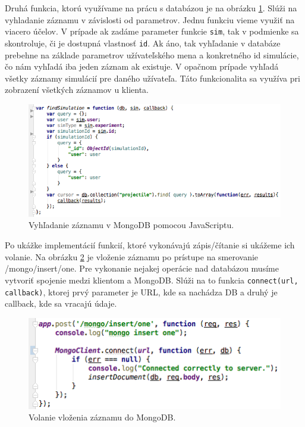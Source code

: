 Druhá funkcia, ktorú využívame na prácu s databázou je na obrázku \ref{img-express-mongodb-find}. 
Slúži na vyhladanie záznamu v závislosti od parametrov. Jednu funkciu vieme využiť na viacero účelov. V prípade ak zadáme parameter funkcie \verb|sim|, tak v podmienke sa skontroluje, či je dostupná vlastnosť \verb|id|. Ak áno, tak vyhľadanie v databáze prebehne na základe parametrov užívateľského mena a konkretného id simulácie, čo nám vyhľadá iba jeden záznam ak existuje. V opačnom prípade vyhľadá všetky záznamy simulácií pre daného užívateľa. Táto funkcionalita sa využíva pri zobrazení všetkých záznamov u klienta.

\begin{figure}[H]
  \centering
  \includegraphics[scale=0.65]{img/code/express-mongodb-find.png}
  \caption{Vyhľadanie záznamu v MongoDB pomocou JavaScriptu.}
  \label{img-express-mongodb-find}
\end{figure}

Po ukážke implementácií funkcií, ktoré vykonávajú zápis/čítanie si ukážeme ich volanie. Na obrázku \ref{img-express-mongodb-insert2} je vloženie záznamu po prístupe na smerovanie /mongo/insert/one.
Pre vykonanie nejakej operácie nad databázou musíme vytvoriť spojenie medzi klientom a MongoDB. Slúži na to funkcia \verb|connect(url, callback)|, ktorej prvý parameter je URL, kde sa nachádza DB a druhý je callback, kde sa vracajú údaje.

\begin{figure}[H]
  \centering
  \includegraphics[scale=0.7]{img/code/express-mongo-insert2.png}
  \caption{Volanie vloženia záznamu do MongoDB.}
  \label{img-express-mongodb-insert2}
\end{figure}

